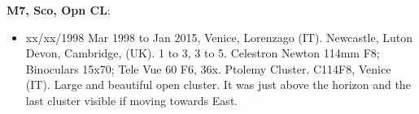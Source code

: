 {\bf M7, Sco, Opn CL}:
\begin{itemize}
\item xx/xx/1998 Mar 1998 to Jan 2015, Venice, Lorenzago (IT). Newcastle, Luton Devon, Cambridge, (UK). 1 to 3, 3 to 5. Celestron Newton 114mm F8; Binoculars 15x70; Tele Vue 60 F6, 36x. Ptolemy Cluster. C114F8, Venice (IT). Large and beautiful open cluster. It was just above the horizon and the last cluster visible if moving towards East.
\end{itemize}

